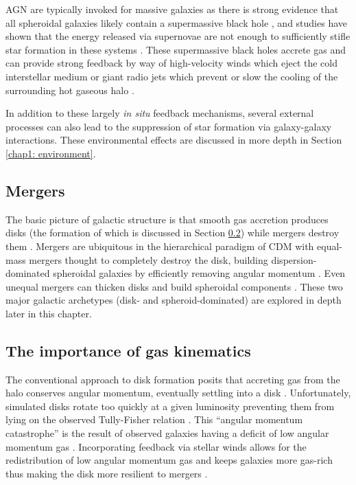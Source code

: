 AGN are typically invoked for massive galaxies as there is strong evidence that all spheroidal galaxies likely contain a supermassive black hole \citep{KormendyHo2013}, and studies have shown that the energy released via supernovae are not enough to sufficiently stifle star formation in these systems \citep{Springel2005}. These supermassive black holes accrete gas and can provide strong feedback by way of high-velocity winds which eject the cold interstellar medium or giant radio jets which prevent or slow the cooling of the surrounding hot gaseous halo \citep{Fabian2012,HeckmanBest2014}.  

In addition to these largely \textit{in situ} feedback mechanisms, several external processes can also lead to the suppression of star formation via galaxy-galaxy interactions. These environmental effects are discussed in more depth in Section \ref{chap1: environment}.


\subsection{Mergers}
\label{chap1: mergers}

The basic picture of galactic structure is that smooth gas accretion produces disks (the formation of which is discussed in Section \ref{chap1: gas kinematics}) while mergers destroy them \citep{Toomre1977}. Mergers are ubiquitous in the hierarchical paradigm of CDM with equal-mass mergers thought to completely destroy the disk, building dispersion-dominated spheroidal galaxies by efficiently removing angular momentum \citep{Barnes1992,Mihos1996}. Even unequal mergers can thicken disks and build spheroidal components \citep{Moster2010}. These two major galactic archetypes (disk- and spheroid-dominated) are explored in depth later in this chapter. %

\subsection{The importance of gas kinematics}
\label{chap1: gas kinematics}

The conventional approach to disk formation posits that accreting gas from the halo conserves angular momentum, eventually settling into a disk \citep{Fall1980,Mo1998}. Unfortunately, simulated disks rotate too quickly at a given luminosity preventing them from lying on the observed Tully-Fisher relation \citep[e.g, review by][]{Brooks2010}. This ``angular momentum catastrophe'' is the result of observed galaxies having a deficit of low angular momentum gas \citep{Bullock2001,vandenBosch2001}. Incorporating feedback via stellar winds allows for the redistribution of low angular momentum gas and keeps galaxies more gas-rich thus making the disk more resilient to mergers \citep{Governato2009,Robertson2006,Brook2012}. 

